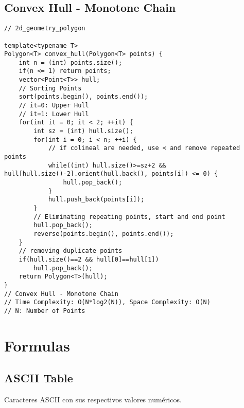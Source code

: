 \documentclass[10pt,letterpaper,twocolumn,twosided]{article}
\begin{document}
\subsection{Convex Hull - Monotone Chain}
\begin{lstlisting}
// 2d_geometry_polygon

template<typename T>
Polygon<T> convex_hull(Polygon<T> points) {
    int n = (int) points.size();
    if(n <= 1) return points;
    vector<Point<T>> hull;
    // Sorting Points
    sort(points.begin(), points.end());
    // it=0: Upper Hull
    // it=1: Lower Hull
    for(int it = 0; it < 2; ++it) {
        int sz = (int) hull.size();
        for(int i = 0; i < n; ++i) {
            // if colineal are needed, use < and remove repeated points
            while((int) hull.size()>=sz+2 && hull[hull.size()-2].orient(hull.back(), points[i]) <= 0) {
                hull.pop_back();
            }
            hull.push_back(points[i]);
        }
        // Eliminating repeating points, start and end point
        hull.pop_back();
        reverse(points.begin(), points.end());
    }
    // removing duplicate points
    if(hull.size()==2 && hull[0]==hull[1])
        hull.pop_back();
    return Polygon<T>(hull);
}
// Convex Hull - Monotone Chain
// Time Complexity: O(N*log2(N)), Space Complexity: O(N)
// N: Number of Points
\end{lstlisting}

\section{Formulas}

\subsection{ASCII Table}

Caracteres ASCII con sus respectivos valores numéricos.
\end{document}
